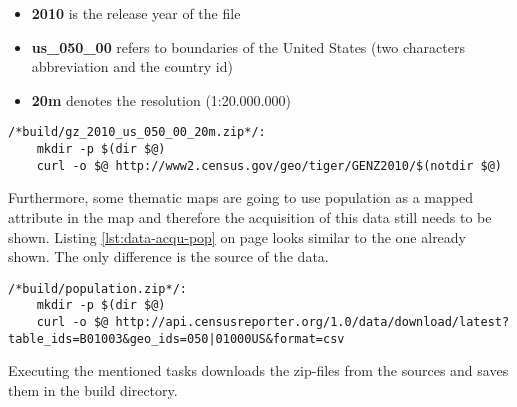 \begin{itemize}
\item \textbf{2010} is the release year of the file
\item \textbf{us\_050\_00} refers to boundaries of the United States (two characters abbreviation and the country id)
\item \textbf{20m} denotes the resolution (1:20.000.000)
\end{itemize}

\begin{lstlisting}[style={makefile}, caption={Make task for downloading cartographic boundaries}, label={lst:data-acqu-zip}]
/*build/gz_2010_us_050_00_20m.zip*/:
    mkdir -p $(dir $@)
    curl -o $@ http://www2.census.gov/geo/tiger/GENZ2010/$(notdir $@)
\end{lstlisting}

Furthermore, some thematic maps are going to use population as a mapped attribute in the map and therefore the acquisition of this data still needs to be shown. Listing \ref{lst:data-acqu-pop} on page \pageref{lst:data-acqu-pop} looks similar to the one already shown. The only difference is the source of the data.

\begin{lstlisting}[style={makefile}, caption={Make task for downloading population of counties}, label={lst:data-acqu-pop}]
/*build/population.zip*/:
    mkdir -p $(dir $@)
    curl -o $@ http://api.censusreporter.org/1.0/data/download/latest?table_ids=B01003&geo_ids=050|01000US&format=csv

\end{lstlisting}

Executing the mentioned tasks downloads the zip-files from the sources and saves them in the build directory.
